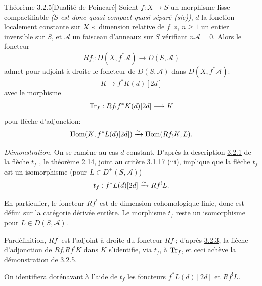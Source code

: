 \documentclass[10pt]{../fichiers-configuration-latex/smfart}
\begin{document}
\begin{enonce*}{Théorème 3.2.5}[Dualité de Poincaré]%
Soient $f:X\rightarrow S$ un morphisme
lisse compactifiable \emph{($S$ est donc quasi-compact
quasi-séparé (sic))}, $d$ la fonction localement constante sur $X$
« dimension relative de $f$ », $n\geq 1$ un entier inversible sur
$S$, et $\mathcal{A}$ un faisceau d'anneaux sur $S$ vérifiant
$n\mathcal{A}=0$. Alors le foncteur
$$
Rf_{!}:D(X,f^{\ast}\mathcal{A})\longrightarrow D(S,\mathcal{A})
$$
admet pour adjoint à droite le foncteur de $D(S,\mathcal{A})$ dans
$D(X,f^{\ast}\mathcal{A})$:
$$
K\longmapsto f^{\ast}K(d)[2d]
$$
avec le morphisme 
$$
\operatorname{Tr}_{f}:Rf_{!}f^{\ast}K(d)[2d]\longrightarrow K
$$
pour flèche d'adjonction:
$$
\operatorname{Hom}(K,f^{\ast}L(d)[2d])\xrightarrow{\sim} \operatorname{Hom}(Rf_{!}K,L){}.
$$
\end{enonce*}

\noindent
\emph{Démonstration}. On se ramène au cas $d$ constant. D'après la
description \hyperref[XVIII.subsubsec3.2.1]{3.2.1} de la flèche $t_{f}$
, le théorème \hyperref[XVIII.thm2.14]{2.14}, 
joint au critère \hyperref[XVIII.prop3.1.17]{3.1.17} (iii), implique que la flèche $t_{f}$ est un
isomorphisme (pour $L\in D^{+}(S,\mathcal{A})$)
$$
t_{f}:f^{\ast}L(d)[2d]\xrightarrow{\sim} Rf^{!}L{}.
$$

En particulier, le foncteur $Rf^{!}$ est de dimension cohomologique
finie, donc est défini sur la catégorie dérivée entière. Le morphisme
$t_{f}$ reste un isomorphisme pour $L\in D(S,\mathcal{A})$.

Par\pageoriginale définition, $Rf^{!}$ est l'adjoint à droite du
foncteur $Rf_{!}$; d'après \hyperref[XVIII.lem3.2.3]{3.2.3}, la flèche
d'adjonction de $Rf_{!}Rf^{!}K$ dans $K$ s'identifie,
via $t_{f}$, à $\operatorname{Tr}_{f}$, et ceci
achève la démonstration de \hyperref[XVIII.thm3.2.5]{3.2.5}.

On identifiera dorénavant à l'aide de $t_{f}$ les foncteurs
$f^{\ast}L(d)[2d]$ et $Rf^{!}L$.
\end{document}
